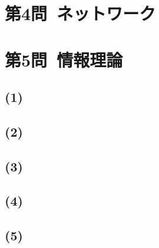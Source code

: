 \documentclass[a4paper,12pt,xelatex,ja=standard]{bxjsarticle}
\begin{document}
\section*{第4問\ ネットワーク}

\section*{第5問\ 情報理論}
\subsection*{(1)}

\subsection*{(2)}

\subsection*{(3)}

\subsection*{(4)}

\subsection*{(5)}
\end{document}
